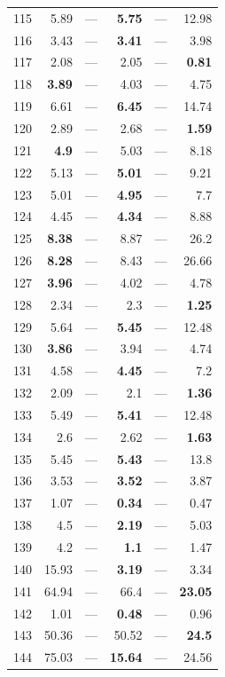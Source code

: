\begin{longtable}{lr@{\hskip 4pt}l@{\hskip 12pt}r@{\hskip 4pt}l@{\hskip 12pt}r}
115 & 5.89 & --- & \textbf{5.75} & --- & 12.98 \\
116 & 3.43 & --- & \textbf{3.41} & --- & 3.98 \\
117 & 2.08 & --- & 2.05 & --- & \textbf{0.81} \\
118 & \textbf{3.89} & --- & 4.03 & --- & 4.75 \\
119 & 6.61 & --- & \textbf{6.45} & --- & 14.74 \\
120 & 2.89 & --- & 2.68 & --- & \textbf{1.59} \\
121 & \textbf{4.9} & --- & 5.03 & --- & 8.18 \\
122 & 5.13 & --- & \textbf{5.01} & --- & 9.21 \\
123 & 5.01 & --- & \textbf{4.95} & --- & 7.7 \\
124 & 4.45 & --- & \textbf{4.34} & --- & 8.88 \\
125 & \textbf{8.38} & --- & 8.87 & --- & 26.2 \\
126 & \textbf{8.28} & --- & 8.43 & --- & 26.66 \\
127 & \textbf{3.96} & --- & 4.02 & --- & 4.78 \\
128 & 2.34 & --- & 2.3 & --- & \textbf{1.25} \\
129 & 5.64 & --- & \textbf{5.45} & --- & 12.48 \\
130 & \textbf{3.86} & --- & 3.94 & --- & 4.74 \\
131 & 4.58 & --- & \textbf{4.45} & --- & 7.2 \\
132 & 2.09 & --- & 2.1 & --- & \textbf{1.36} \\
133 & 5.49 & --- & \textbf{5.41} & --- & 12.48 \\
134 & 2.6 & --- & 2.62 & --- & \textbf{1.63} \\
135 & 5.45 & --- & \textbf{5.43} & --- & 13.8 \\
136 & 3.53 & --- & \textbf{3.52} & --- & 3.87 \\
137 & 1.07 & --- & \textbf{0.34} & --- & 0.47 \\
138 & 4.5 & --- & \textbf{2.19} & --- & 5.03 \\
139 & 4.2 & --- & \textbf{1.1} & --- & 1.47 \\
140 & 15.93 & --- & \textbf{3.19} & --- & 3.34 \\
141 & 64.94 & --- & 66.4 & --- & \textbf{23.05} \\
142 & 1.01 & --- & \textbf{0.48} & --- & 0.96 \\
143 & 50.36 & --- & 50.52 & --- & \textbf{24.5} \\
144 & 75.03 & --- & \textbf{15.64} & --- & 24.56 \\

\end{longtable}
